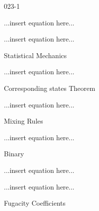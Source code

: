 \begin{mitframe}{023-1}

    
\begin{listone}
        
    \item ...insert equation here...
        
    \item ...insert equation here...
         
    \item Statistical Mechanics
    
    \begin{listtwo}
		
        \item ...insert equation here...
	
    \end{listtwo}
    
    \item Corresponding states Theorem

    \begin{listtwo}
		
        \item ...insert equation here...
	
    \end{listtwo}
    
    \item Mixing Rules
    
    \begin{listtwo}
		
        \item ...insert equation here...
	
    	\item Binary
        
        \begin{listthree}
		
            \item ...insert equation here...

			\item ...insert equation here...
                
    	\end{listthree}
		    
    \end{listtwo}    
    
    \item Fugacity Coefficients

    \begin{listtwo}
		

\end{listtwo}
\end{listone}
\end{mitframe}
